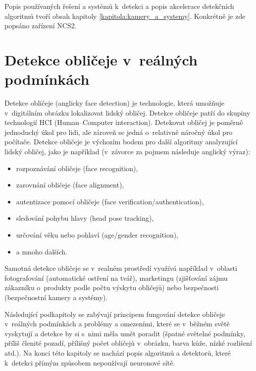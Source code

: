 Popis používaných řešení a systémů k~detekci a popis akcelerace detekčních algoritmů tvoří obsah kapitoly \ref{kapitola:kamery_a_systemy}. Konkrétně je zde popsáno zařízení NCS2.



\chapter{Detekce obličeje v~reálných podmínkách}
\label{kapitola:detekce_obliceje}
Detekce obličeje (anglicky face detection) \cite{fdReview, frReview} je technologie, která umožňuje v~digitálním obrázku lokalizovat lidský obličej. Detekce obličeje patří do skupiny technologií HCI (Human--Computer interaction).
Detekovat obličej je poměrně jednoduchý úkol pro lidi, ale zároveň se jedná o~relativně náročný úkol pro počítače.
Detekce obličeje je výchozím bodem pro další algoritmy analyzující lidský obličej, jako je například (v~závorce za pojmem následuje anglický výraz):
\begin{itemize}
  \item rozpoznávání obličeje (face recognition),
  \item zarovnání obličeje (face alignment),
  \item autentizace pomocí obličeje (face verification/authentication),
  \item sledování pohybu hlavy (head pose tracking),
  \item určování věku nebo pohlaví (age/gender recognition),
  \item[] a mnoho dalších. 
\end{itemize}

Samotná detekce obličeje se v~realném prostředí využívá například v~oblasti fotografování (automatické ostření na tvář), marketingu (zjišťování zájmu zákazníku o~produkty podle počtu výskytu obličejů) nebo bezpečnosti (bezpečnostní kamery a systémy).

Následující podkapitoly se zabývají principem fungování detekce obličeje v~reálných podmínkách a problémy a omezeními, které se v~běžném světě vyskytují a detekce by si s~nimi měla umět poradit (špatné světelné podmínky, příliš členité pozadí, přílišný počet obličejů v~obrázku, barva kůže, nízké rozlišení atd.). Na konci této kapitoly se nachází popis algoritmů a detektorů, které k~detekci přímým způsobem nepoužívají neuronové sítě.

